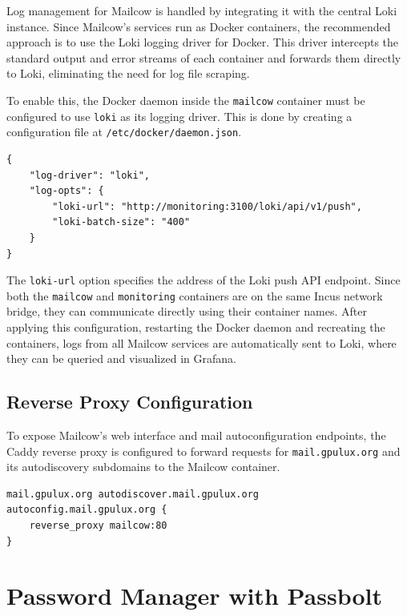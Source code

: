 Log management for Mailcow is handled by integrating it with the central Loki instance. Since Mailcow's services run as Docker containers, the recommended approach is to use the Loki logging driver for Docker\cite{loki-docker-driver}. This driver intercepts the standard output and error streams of each container and forwards them directly to Loki, eliminating the need for log file scraping.

To enable this, the Docker daemon inside the \texttt{mailcow} container must be configured to use \texttt{loki} as its logging driver. This is done by creating a configuration file at \texttt{/etc/docker/daemon.json}\cite{loki-docker-driver-config}.

\begin{lstlisting}[caption={Docker daemon configuration to use the Loki logging driver.}]
{
    "log-driver": "loki",
    "log-opts": {
        "loki-url": "http://monitoring:3100/loki/api/v1/push",
        "loki-batch-size": "400"
    }
}
\end{lstlisting}

The \texttt{loki-url} option specifies the address of the Loki push API endpoint. Since both the \texttt{mailcow} and \texttt{monitoring} containers are on the same Incus network bridge, they can communicate directly using their container names. After applying this configuration, restarting the Docker daemon and recreating the containers, logs from all Mailcow services are automatically sent to Loki, where they can be queried and visualized in Grafana.

\subsection*{Reverse Proxy Configuration}

To expose Mailcow's web interface and mail autoconfiguration endpoints, the Caddy reverse proxy is configured to forward requests for \texttt{mail.gpulux.org} and its autodiscovery subdomains to the Mailcow container.

\begin{lstlisting}[caption={Caddyfile configuration to reverse proxy Mailcow.}]
mail.gpulux.org autodiscover.mail.gpulux.org autoconfig.mail.gpulux.org {
    reverse_proxy mailcow:80
}
\end{lstlisting}

\section{Password Manager with Passbolt}

